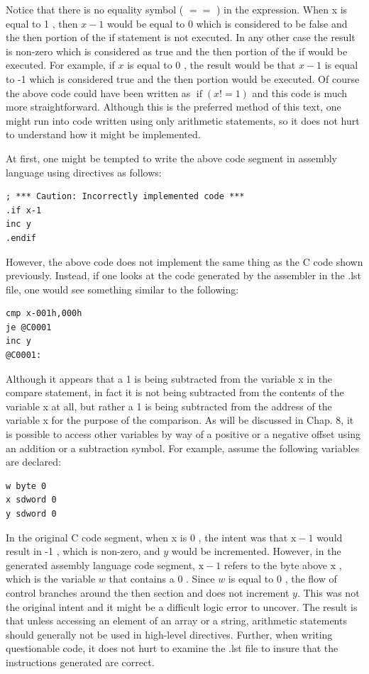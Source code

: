 \documentclass[10pt]{book}
\begin{document}
Notice that there is no equality symbol ( $==$ ) in the expression. When x is equal to 1 , then $x-1$ would be equal to 0 which is considered to be false and the then portion of the if statement is not executed. In any other case the result is non-zero which is considered as true and the then portion of the if would be executed. For example, if $x$ is equal to 0 , the result would be that $x-1$ is equal to -1 which is considered true and the then portion would be executed. Of course the above code could have been written as $\operatorname{if}(x!=1)$ and this code is much more straightforward. Although this is the preferred method of this text, one might run into code written using only arithmetic statements, so it does not hurt to understand how it might be implemented.

At first, one might be tempted to write the above code segment in assembly language using directives as follows:

\begin{verbatim}
; *** Caution: Incorrectly implemented code ***
.if x-1
inc y
.endif
\end{verbatim}

However, the above code does not implement the same thing as the C code shown previously. Instead, if one looks at the code generated by the assembler in the .lst file, one would see something similar to the following:

\begin{verbatim}
cmp x-001h,000h
je @C0001
inc y
@C0001:
\end{verbatim}

Although it appears that a 1 is being subtracted from the variable x in the compare statement, in fact it is not being subtracted from the contents of the variable x at all, but rather a 1 is being subtracted from the address of the variable x for the purpose of the comparison. As will be discussed in Chap. 8, it is possible to access other variables by way of a positive or a negative offset using an addition or a subtraction symbol. For example, assume the following variables are declared:

\begin{verbatim}
w byte 0
x sdword 0
y sdword 0
\end{verbatim}

In the original C code segment, when x is 0 , the intent was that $\mathrm{x}-1$ would result in -1 , which is non-zero, and $y$ would be incremented. However, in the generated assembly language code segment, $\mathrm{x}-1$ refers to the byte above x , which is the variable $w$ that contains a 0 . Since $w$ is equal to 0 , the flow of control branches around the then section and does not increment $y$. This was not the original intent and it might be a difficult logic error to uncover. The result is that unless accessing an element of an array or a string, arithmetic statements should generally not be used in high-level directives. Further, when writing questionable code, it does not hurt to examine the .lst file to insure that the instructions generated are correct.
\end{document}
